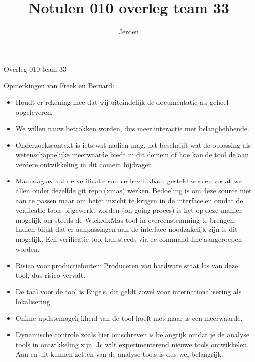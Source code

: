 \documentclass{article}
\title{Notulen 010 overleg team 33}
\author{Jeroen}
\begin{document}

\begin{Minutes}{Overleg 010 team 33}

\maketitle%


Opmerkingen van Freek en Bernard: 
\begin{itemize}
\item Houdt er rekening mee dat wij uiteindelijk de documentatie als geheel opgeleveren.
\item We willen nauw betrokken worden, dus meer interactie met belanghebbende.
\item Onderzoekscontext is iets wat nadien mag, het beschrijft wat de oplossing
als wetenschappelijke meerwaarde biedt in dit domein of hoe kan de tool de aan
verdere ontwikkeling in dit domein bijdragen.
\item Maandag as. zal de verificatie source beschikbaar gesteld worden zodat we 
allen onder dezelfde git repo (xmas) werken.
Bedoeling is om deze source niet aan te passen maar om beter inzicht te krijgen
in de interface en omdat de verificatie tools bijgewerkt worden (on going
proces) is het op deze manier mogelijk om steeds de WickedxMas tool in
overeenstemming te brengen. Indien blijkt dat er aanpassingen aan de interface
noodzakelijk zijn is dit mogelijk. Een verificatie tool kan steeds via de
command line aangeroepen worden.
\end{itemize}



\begin{itemize}
\item Risico voor productiefouten: Produceren van hardware staat los van deze tool, dus risico vervalt.
\item De taal voor de tool is Engels, dit geldt zowel voor internationalisering als lokalisering.
\item Online updatemogelijkheid van de tool hoeft niet maar is een meerwaarde.
\item Dynamische controle zoals hier omschreven is belangrijk omdat je de analyse
	tools in ontwikkeling zijn. Je wilt experimenterend nieuwe tools ontwikkelen. Aan en uit
	kunnen zetten van de analyse tools is dus wel belangrijk.
		

\end{itemize}
\end{Minutes}
\end{document}
